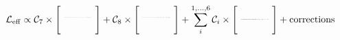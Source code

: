 \begin{equation*}
    \mathcal{L}_{\mathrm{eff}} \propto
\mathcal{C}_7 \times
\Biggl[
\raisebox{5pt}{
\resizebox{0.085\textwidth}{!}{
\feynmandiagram [small, inline=(b.base), vertical=b to d] {
    a --  b [dot] -- c,
    b -- [boson] d [particle={\LARGE$\gamma$}],
    };
}
}\Biggr]
+
\mathcal{C}_8 \times
\Biggl[
\raisebox{5pt}{
\resizebox{0.085\textwidth}{!}{
\feynmandiagram [small, inline=(b.base), vertical=b to d] {
    a --  b [dot] --  c,
    b -- [boson] d [particle={\LARGE$g$}],
    };
}
}\Biggr]
+
\sum_i^{1,...,6}
\mathcal{C}_i\times
\Biggl[
\raisebox{3pt}{
\resizebox{0.085\textwidth}{!}{
\feynmandiagram [small, inline=(b.base), horizontal=a to c] {
    a --  b [dot] --  c,
    d --  b -- e,
    };
}
}\Biggr]
+\mathrm{corrections}
\end{equation*}